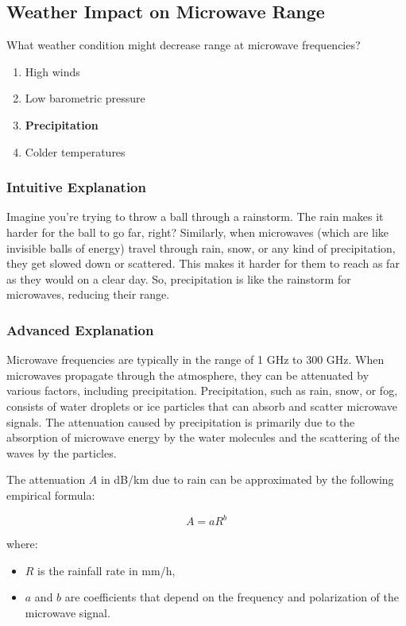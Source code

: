 \subsection{Weather Impact on Microwave Range}
\label{T3A07}

\begin{tcolorbox}[colback=gray!10!white,colframe=black!75!black,title=T3A07]
What weather condition might decrease range at microwave frequencies?
\begin{enumerate}[label=\Alph*)]
    \item High winds
    \item Low barometric pressure
    \item \textbf{Precipitation}
    \item Colder temperatures
\end{enumerate}
\end{tcolorbox}

\subsubsection{Intuitive Explanation}
Imagine you're trying to throw a ball through a rainstorm. The rain makes it harder for the ball to go far, right? Similarly, when microwaves (which are like invisible balls of energy) travel through rain, snow, or any kind of precipitation, they get slowed down or scattered. This makes it harder for them to reach as far as they would on a clear day. So, precipitation is like the rainstorm for microwaves, reducing their range.

\subsubsection{Advanced Explanation}
Microwave frequencies are typically in the range of 1 GHz to 300 GHz. When microwaves propagate through the atmosphere, they can be attenuated by various factors, including precipitation. Precipitation, such as rain, snow, or fog, consists of water droplets or ice particles that can absorb and scatter microwave signals. The attenuation caused by precipitation is primarily due to the absorption of microwave energy by the water molecules and the scattering of the waves by the particles.

The attenuation \( A \) in dB/km due to rain can be approximated by the following empirical formula:

\[
A = aR^b
\]

where:
\begin{itemize}
    \item \( R \) is the rainfall rate in mm/h,
    \item \( a \) and \( b \) are coefficients that depend on the frequency and polarization of the microwave signal.
\end{itemize}

